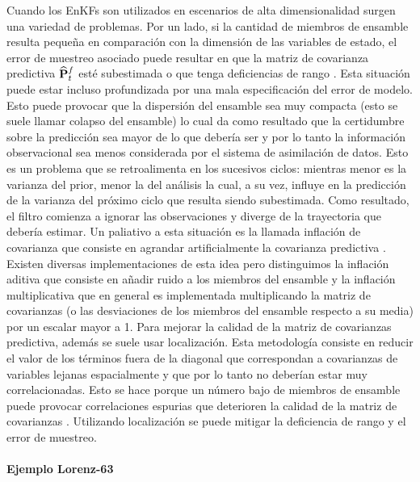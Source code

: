 Cuando los EnKFs son utilizados en escenarios de alta dimensionalidad surgen una variedad de problemas. Por un lado, si la cantidad de miembros de ensamble resulta pequeña en comparación con la dimensión de las variables de estado, el error de muestreo asociado puede resultar en que la matriz de covarianza predictiva $\widehat{\mathbf{P}}_t^f$ esté subestimada o que tenga deficiencias de rango \citep{Miyoshi2011}. Esta situación puede estar incluso profundizada por una mala especificación del error de modelo. Esto puede provocar que la dispersión del ensamble sea muy compacta (esto se suele llamar colapso del ensamble) lo cual da como resultado que la certidumbre sobre la predicción sea mayor de lo que debería ser y por lo tanto la información observacional sea menos considerada por el sistema de asimilación de datos. Esto es un problema que se retroalimenta en los sucesivos ciclos: mientras menor es la varianza del prior, menor la del análisis la cual, a su vez, influye en la predicción de la varianza del próximo ciclo que resulta siendo subestimada. Como resultado, el filtro comienza a ignorar las observaciones y diverge de la trayectoria que debería estimar. Un paliativo a esta situación es la llamada inflación de covarianza que consiste en agrandar artificialmente la covarianza predictiva \citep{Anderson1999}. Existen diversas implementaciones de esta idea pero distinguimos la inflación aditiva que consiste en añadir ruido a los miembros del ensamble y la inflación multiplicativa que en general es implementada multiplicando la matriz de covarianzas (o las desviaciones de los miembros del ensamble respecto a su media) por un escalar mayor a 1. Para mejorar la calidad de la matriz de covarianzas predictiva, además se suele usar localización. Esta metodología consiste en reducir el valor de los términos fuera de la diagonal que correspondan a covarianzas de variables lejanas espacialmente y que por lo tanto no deberían estar muy correlacionadas. Esto se hace porque un número bajo de miembros de ensamble puede provocar correlaciones espurias que deterioren la calidad de la matriz de covarianzas \citep{Hamill2001}. Utilizando localización se puede mitigar la deficiencia de rango y el error de muestreo. 

\paragraph{Ejemplo Lorenz-63}


